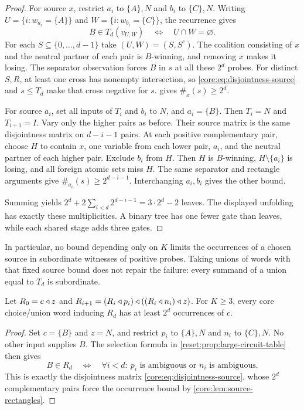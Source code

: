\begin{proof}
For source $x$, restrict $a_i$ to $\{A\},N$ and $b_i$ to $\{C\},N$.
Writing $U=\{i:w_{a_i}=\{A\}\}$ and
$W=\{i:w_{b_i}=\{C\}\}$, the recurrence gives
\begin{equation}\label{core:eq:disjointness-source}
 B\in T_d(v_{U,W})\quad\Longleftrightarrow\quad U\cap W=\varnothing.
\end{equation}
For each $S\subseteq\{0,\ldots,d-1\}$ take $(U,W)=(S,S^c)$.
The coalition consisting of $x$ and the neutral partner of each pair
is $B$-winning, and removing $x$ makes it losing. The separator
observation forces $B$ in $s$ at all these $2^d$ probes.
For distinct $S,R$, at least one cross has nonempty intersection,
so \eqref{core:eq:disjointness-source} and $s\leq T_d$ make that cross
negative for $s$.  gives
$\#_x(s)\geq2^d$.

For source $a_i$, set all inputs of $T_i$ and $b_i$ to $N$, and
$a_i=\{B\}$. Then $T_i=N$ and $T_{i+1}=I$. Vary only the higher
pairs as before. Their source matrix is the same disjointness matrix
on $d-i-1$ pairs. At each positive complementary pair, choose $H$
to contain $x$, one variable from each lower pair, $a_i$, and the
neutral partner of each higher pair. Exclude $b_i$ from $H$.
Then $H$ is $B$-winning, $H\setminus\{a_i\}$ is losing, and all
foreign atomic sets miss $H$. The same separator and rectangle
arguments give $\#_{a_i}(s)\geq2^{d-i-1}$. Interchanging $a_i,b_i$
gives the other bound.

Summing yields
$2^d+2\sum_{i<d}2^{d-i-1}=3\cdot2^d-2$ leaves. The displayed
unfolding has exactly these multiplicities. A binary tree has one
fewer gate than leaves, while each shared stage adds three gates.
\end{proof}

In particular, no bound depending only on $K$ limits the occurrences
of a chosen source in subordinate witnesses of positive probes.
Taking unions of words with that fixed source bound does not repair
the failure: every summand of a union equal to $T_d$ is subordinate.

\begin{corollary}
\label{core:cor:reset-ambient-tree-bound}
Let $R_0=c\mathbin{\triangleleft} z$ and
$R_{i+1}=(R_i\mathbin{\triangleleft} p_i)\mathbin{\triangleleft}((R_i\mathbin{\triangleleft} n_i)\mathbin{\triangleleft} z)$.
For $K\geq3$, every core choice/union word inducing $R_d$ has at
least $2^d$ occurrences of $c$.
\end{corollary}
\begin{proof}
Set $c=\{B\}$ and $z=N$, and restrict $p_i$ to $\{A\},N$ and
$n_i$ to $\{C\},N$. No other input supplies $B$.
The selection formula in \cref{reset:prop:large-circuit-table} then gives
\[
 B\in R_d\quad\Longleftrightarrow\quad
 \forall i<d:\ p_i\text{ is ambiguous or }n_i\text{ is ambiguous}.
\]
This is exactly the disjointness matrix
\eqref{core:eq:disjointness-source}, whose $2^d$ complementary
pairs force the occurrence bound by \cref{core:lem:source-rectangles}.
\end{proof}
